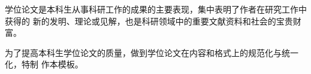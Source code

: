 学位论文是本科生从事科研工作的成果的主要表现，集中表明了作者在研究工作中获得的
新的发明、理论或见解，也是科研领域中的重要文献资料和社会的宝贵财富。

为了提高本科生学位论文的质量，做到学位论文在内容和格式上的规范化与统一化，特制
作本模板。

